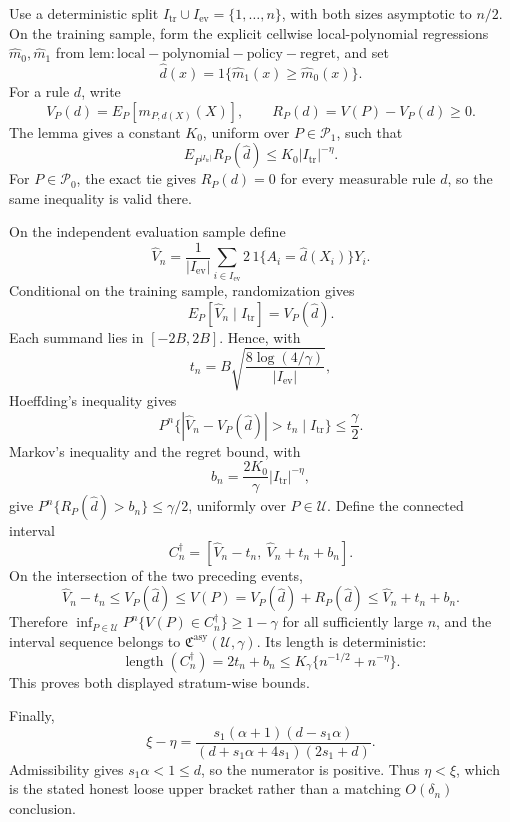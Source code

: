 Use a deterministic split \(I_{\mathrm{tr}}\cup I_{\mathrm{ev}}=\{1,\ldots,n\}\), with both sizes asymptotic to \(n/2\).  On the training sample, form the explicit cellwise local-polynomial regressions \(\widehat m_0,\widehat m_1\) from \(\mathrm{lem:local-polynomial-policy-regret}\), and set
\[
 \widehat d(x)=1\{\widehat m_1(x)\ge\widehat m_0(x)\}.
\]
For a rule \(d\), write
\[
 V_P(d)=E_P[m_{P,d(X)}(X)],
 \qquad
 R_P(d)=V(P)-V_P(d)\ge0.
\]
The lemma gives a constant \(K_0\), uniform over \(P\in\mathcal P_1\), such that
\[
 E_{P^{|I_{\mathrm{tr}}|}}R_P(\widehat d)
 \le K_0|I_{\mathrm{tr}}|^{-\eta}.
\]
For \(P\in\mathcal P_0\), the exact tie gives \(R_P(d)=0\) for every measurable rule \(d\), so the same inequality is valid there.

On the independent evaluation sample define
\[
 \widehat V_n
 =\frac1{|I_{\mathrm{ev}}|}
 \sum_{i\in I_{\mathrm{ev}}}2\,1\{A_i=\widehat d(X_i)\}Y_i.
\]
Conditional on the training sample, randomization gives
\[
 E_P[\widehat V_n\mid I_{\mathrm{tr}}]=V_P(\widehat d).
\]
Each summand lies in \([-2B,2B]\).  Hence, with
\[
 t_n=B\sqrt{\frac{8\log(4/\gamma)}{|I_{\mathrm{ev}}|}},
\]
Hoeffding's inequality gives
\[
 P^n\{|\widehat V_n-V_P(\widehat d)|>t_n\mid I_{\mathrm{tr}}\}\le\frac\gamma2.
\]
Markov's inequality and the regret bound, with
\[
 b_n=\frac{2K_0}{\gamma}|I_{\mathrm{tr}}|^{-\eta},
\]
give \(P^n\{R_P(\widehat d)>b_n\}\le\gamma/2\), uniformly over \(P\in\mathcal U\).  Define the connected interval
\[
 C_n^\dagger=[\widehat V_n-t_n,\ \widehat V_n+t_n+b_n].
\]
On the intersection of the two preceding events,
\[
 \widehat V_n-t_n
 \le V_P(\widehat d)
 \le V(P)=V_P(\widehat d)+R_P(\widehat d)
 \le\widehat V_n+t_n+b_n.
\]
Therefore \(\inf_{P\in\mathcal U}P^n\{V(P)\in C_n^\dagger\}\ge1-\gamma\) for all sufficiently large \(n\), and the interval sequence belongs to \(\mathfrak C^{\mathrm{asy}}(\mathcal U,\gamma)\).  Its length is deterministic:
\[
 \operatorname{length}(C_n^\dagger)=2t_n+b_n
 \le K_\gamma\{n^{-1/2}+n^{-\eta}\}.
\]
This proves both displayed stratum-wise bounds.

Finally,
\[
 \xi-\eta
 =\frac{s_1(\alpha+1)(d-s_1\alpha)}
 {(d+s_1\alpha+4s_1)(2s_1+d)}.
\]
Admissibility gives \(s_1\alpha<1\le d\), so the numerator is positive.  Thus \(\eta<\xi\), which is the stated honest loose upper bracket rather than a matching \(O(\delta_n)\) conclusion.
